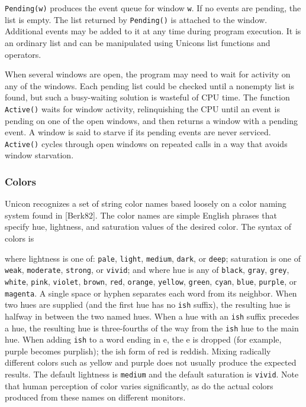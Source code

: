 \texttt{Pending(w)} produces the event queue for window \texttt{w}.
If no events are pending, the list is empty. The list returned by
\texttt{Pending()} is
attached to the window. Additional events may be added to it at any
time during program execution.  It is an ordinary list and
can be manipulated using Unicon{\textquotesingle}s list functions and
operators.

When several windows are open, the program may need to wait for activity on
any of the windows. Each pending list could be checked until a nonempty list is
found, but such a busy-waiting solution is wasteful of CPU time. The
function \texttt{Active()} waits for window activity, relinquishing the CPU
until an event is pending on one of the open windows, and then returns
a window with a pending event. A window is said to starve if its
pending events are never serviced. \texttt{Active()} cycles through open
windows on repeated calls in a way that avoids window starvation.

\subsubsection{Colors}

Unicon recognizes a set of string color names based loosely on a color
naming system found in [Berk82]. The color names are simple
English phrases that specify hue, lightness, and saturation values of
the desired color. The syntax of colors is


\noindent
where lightness is one of: \texttt{pale}, \texttt{light}, \texttt{medium},
\texttt{dark}, or \texttt{deep}; saturation is one of \texttt{weak},
\texttt{moderate}, \texttt{strong}, or \texttt{vivid}; and where hue is any of
\texttt{black}, \texttt{gray}, \texttt{grey}, \texttt{white}, \texttt{pink},
\texttt{violet}, \texttt{brown}, \texttt{red}, \texttt{orange},
\texttt{yellow}, \texttt{green}, \texttt{cyan}, \texttt{blue}, \texttt{purple},
or \texttt{magenta}. A single space or hyphen
separates each word from its neighbor. When two hues are supplied
(and the first hue has no \texttt{ish} suffix), the resulting hue is
halfway in between the two named hues. When a hue with an \texttt{ish} suffix
precedes a hue, the resulting hue is three-fourths of the way
from the \texttt{ish} hue to the main hue. When adding \texttt{ish} to a word
ending in e, the e is dropped (for example, purple becomes purplish); the ish
form of red is reddish. Mixing radically different colors such as
yellow and purple does not usually produce the expected results. The
default lightness is \texttt{medium} and the default saturation is
\texttt{vivid}. Note that human perception of color varies significantly, as
do the actual colors produced from these names on different monitors.

